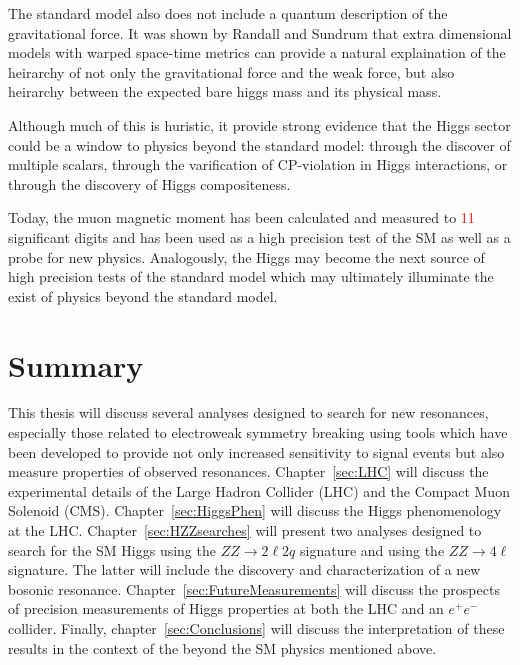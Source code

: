 The standard model also does not include a quantum description of the 
gravitational force.  It was shown by Randall and Sundrum that extra 
dimensional models with warped space-time metrics can provide a natural 
explaination of the heirarchy of not only the gravitational force and the 
weak force, but also heirarchy between the expected bare higgs mass and 
its physical mass. 

Although much of this is huristic, it provide strong evidence 
that the Higgs sector could be a window to physics beyond the standard
model: through the discover of multiple scalars, through 
the varification of CP-violation in Higgs interactions, or 
through the discovery of Higgs compositeness.  

Today, the muon 
magnetic moment has been calculated and measured to \textcolor{red}{11} 
significant digits and has been used as a high precision test of the SM 
as well as a probe for new physics.   Analogously, the Higgs may become
the next source of high precision tests of the standard model which may
ultimately illuminate the exist of physics beyond the standard model.  

\section{Summary}

This thesis will discuss several analyses designed to search for 
new resonances, especially those related to electroweak symmetry 
breaking using tools which have been developed to provide not only 
increased sensitivity to signal events but also measure properties of 
observed resonances. 
Chapter~\ref{sec:LHC} will 
discuss the experimental details of the Large Hadron Collider (LHC) and 
the Compact Muon Solenoid (CMS). Chapter~\ref{sec:HiggsPhen} will discuss 
the Higgs phenomenology at the LHC.  Chapter~\ref{sec:HZZsearches} will
present two analyses designed to search for the SM Higgs using the 
$ZZ\to2\ell 2q$ signature and using the $ZZ\to 4\ell$ signature. The 
latter will include the discovery and characterization of a new
bosonic resonance. Chapter~\ref{sec:FutureMeasurements} will discuss 
the prospects of precision measurements of Higgs properties at both
the LHC and an $e^+e^-$ collider. Finally, chapter~\ref{sec:Conclusions}
will discuss the interpretation of these results in the context of the 
beyond the SM physics mentioned above.  

